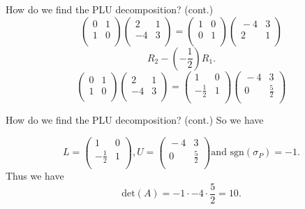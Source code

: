 \documentclass{beamer}
\begin{document}
\begin{frame}{How do we find the PLU decomposition? (cont.)}
    \pause
    \[
        \begin{pmatrix}{}
            0 & 1 \\
            1 & 0 \\
            \end{pmatrix}\begin{pmatrix}{}
            2 & 1 \\
            -4 & 3 \\
        \end{pmatrix}
        =\begin{pmatrix}{}
            1 & 0 \\
            0 & 1 \\
        \end{pmatrix}
        \begin{pmatrix}{}
            -4 & 3 \\
            2 & 1 \\
        \end{pmatrix}
    \]
    \pause
    \[
    R_2-(-\frac{1}{2})R_1. 
    \]\pause
    \[
        \begin{pmatrix}{}
            0 & 1 \\
            1 & 0 \\
            \end{pmatrix}\begin{pmatrix}{}
            2 & 1 \\
            -4 & 3 \\
        \end{pmatrix}
        =\begin{pmatrix}{}
            1 & 0 \\
            -\frac{1}{2} & 1 \\
        \end{pmatrix}
        \begin{pmatrix}{}
            -4 & 3 \\
            0 & \frac{5}{2} \\
        \end{pmatrix}
    \]

\end{frame}



\begin{frame}{How do we find the PLU decomposition? (cont.)}
    So we have

    \[L=\begin{pmatrix}{}
            1 & 0 \\
            -\frac{1}{2} & 1 \\
            \end{pmatrix}, U=\begin{pmatrix}{}
            -4 & 3 \\
            0 & \frac{5}{2} \\
    \end{pmatrix} \text{and sgn} (\sigma_P)=-1.\]
    \pause
    Thus we have
    \[
        \text{det}(A)
        =-1\cdot-4\cdot\frac{5}{2}=10.
    \]

\end{frame}
\end{document}
